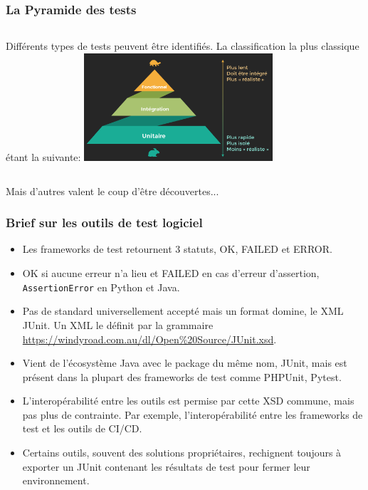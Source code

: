 \documentclass{beamer}
\begin{document}
    \begin{frame}
        \transdissolve
        \frametitle{La Pyramide des tests}
        \begin{columns}
            Différents types de tests peuvent être identifiés.
            La classification la plus classique étant la suivante\footnotemark :
            \centering
            \includegraphics[width=7cm]{image/classic-test-pyramid.png}
        \end{columns}
        \bigbreak
        Mais d'autres valent le coup d'être découvertes...

    \end{frame}

    \begin{frame}
        \transdissolve
        \frametitle{Brief sur les outils de test logiciel}
        \begin{itemize}
            \item Les frameworks de test retournent 3 statuts, OK, FAILED et ERROR.

            \item OK si aucune erreur n’a lieu et FAILED en cas d’erreur d’assertion, \lstinline{AssertionError} en Python et Java.

            \item Pas de standard universellement accepté mais un format domine, le XML JUnit. Un XML le définit par la grammaire \url{https://windyroad.com.au/dl/Open\%20Source/JUnit.xsd}.

            \item Vient de l’écosystème Java avec le package du même nom, JUnit, mais est présent dans la plupart des frameworks de test comme PHPUnit, Pytest.

            \item L’interopérabilité entre les outils est permise par cette XSD commune, mais pas plus de contrainte. Par exemple, l’interopérabilité entre les frameworks de test et les outils de CI/CD.

            \item Certains outils, souvent des solutions propriétaires, rechignent toujours à exporter un JUnit contenant les résultats de test pour fermer leur environnement.

        \end{itemize}
    \end{frame}
\end{document}
